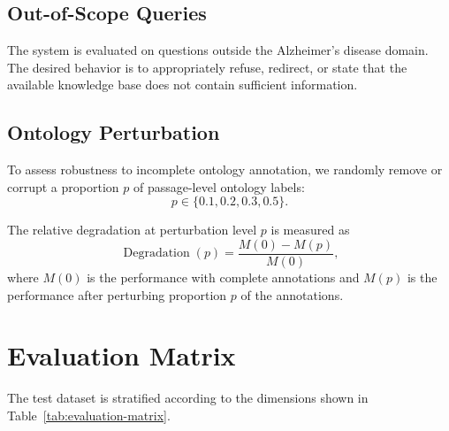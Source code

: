 \documentclass{article}
\begin{document}
\subsection{Out-of-Scope Queries}

The system is evaluated on questions outside the Alzheimer's disease domain. The desired behavior is to appropriately refuse, redirect, or state that the available knowledge base does not contain sufficient information.

\subsection{Ontology Perturbation}

To assess robustness to incomplete ontology annotation, we randomly remove or corrupt a proportion $p$ of passage-level ontology labels:
\begin{equation}
    p \in \{0.1,0.2,0.3,0.5\}.
\end{equation}

The relative degradation at perturbation level $p$ is measured as
\begin{equation}
    \operatorname{Degradation}(p)
    =
    \frac{
    M(0)-M(p)
    }{
    M(0)
    },
\end{equation}
where $M(0)$ is the performance with complete annotations and $M(p)$ is the performance after perturbing proportion $p$ of the annotations.

\section{Evaluation Matrix}

The test dataset is stratified according to the dimensions shown in Table~\ref{tab:evaluation-matrix}.
\begin{table}[t]
    \centering
    \caption{Proposed dimensions for stratified evaluation.}
    \label{tab:evaluation-matrix}
\end{table}
\end{document}
